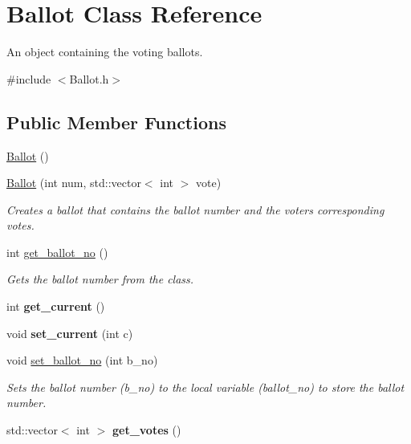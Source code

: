 \hypertarget{class_ballot}{}\section{Ballot Class Reference}
\label{class_ballot}


An object containing the voting ballots.  




{\ttfamily \#include $<$Ballot.\+h$>$}

\subsection*{Public Member Functions}
\begin{DoxyCompactItemize}
\item 
\hyperlink{class_ballot_af9078126260b3f58ea91f6b82797396b}{Ballot} ()
\item 
\hyperlink{class_ballot_afdbfa652a622a1d5aad8ec911a29a91f}{Ballot} (int num, std\+::vector$<$ int $>$ vote)
\begin{DoxyCompactList}\small\item\em Creates a ballot that contains the ballot number and the voters corresponding votes. \end{DoxyCompactList}\item 
int \hyperlink{class_ballot_ae68cc4486852163b21b85d0b96916a5e}{get\+\_\+ballot\+\_\+no} ()\hypertarget{class_ballot_ae68cc4486852163b21b85d0b96916a5e}{}\label{class_ballot_ae68cc4486852163b21b85d0b96916a5e}

\begin{DoxyCompactList}\small\item\em Gets the ballot number from the class. \end{DoxyCompactList}\item 
int {\bfseries get\+\_\+current} ()\hypertarget{class_ballot_a0a0775b462086988e8fc43b2afa27493}{}\label{class_ballot_a0a0775b462086988e8fc43b2afa27493}

\item 
void {\bfseries set\+\_\+current} (int c)\hypertarget{class_ballot_afbd626a534165145a4e60cc9519d3123}{}\label{class_ballot_afbd626a534165145a4e60cc9519d3123}

\item 
void \hyperlink{class_ballot_a72f501296fc05e981791b5b380cc5152}{set\+\_\+ballot\+\_\+no} (int b\+\_\+no)
\begin{DoxyCompactList}\small\item\em Sets the ballot number (b\+\_\+no) to the local variable (ballot\+\_\+no) to store the ballot number. \end{DoxyCompactList}\item 
std\+::vector$<$ int $>$ {\bfseries get\+\_\+votes} ()\hypertarget{class_ballot_aa276dba8f1cc470e04c6d71ad801fc5e}{}\label{class_ballot_aa276dba8f1cc470e04c6d71ad801fc5e}


\end{DoxyCompactItemize}
